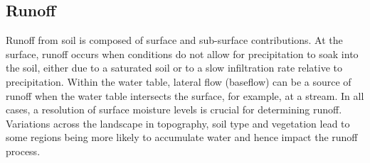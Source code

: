 \documentclass[twoside,10pt]{report}
\begin{document}

\subsection{Runoff}

Runoff from soil is composed of surface and sub-surface contributions.  At the surface, runoff occurs when conditions do not allow for precipitation to soak into the soil, either due to a saturated soil or to a slow infiltration rate relative to precipitation. Within the water table, lateral flow (baseflow) can be a source of runoff when the water table intersects the surface, for example, at a stream. In all cases, a resolution of surface moisture levels is crucial for determining runoff. Variations across the landscape in topography, soil type and vegetation lead to some regions being more likely to accumulate water and hence impact the runoff process. 
\end{document}

